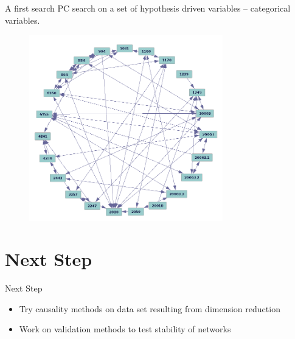 \documentclass[10pt]{beamer} %
\begin{document}
\begin{frame}[plain]{A first search}
PC search on a set of hypothesis driven variables -- categorical variables.
\begin{figure}
\includegraphics[width = 0.75\textwidth]{images/cat.png}
\end{figure}
\end{frame}

\section{Next Step}
\begin{frame}[plain]{Next Step}
\begin{itemize}
\item Try causality methods on data set resulting from dimension reduction
\vspace{0.3cm}



\item Work on validation methods to test stability of networks 
\end{itemize}


\end{frame}
\end{document}
